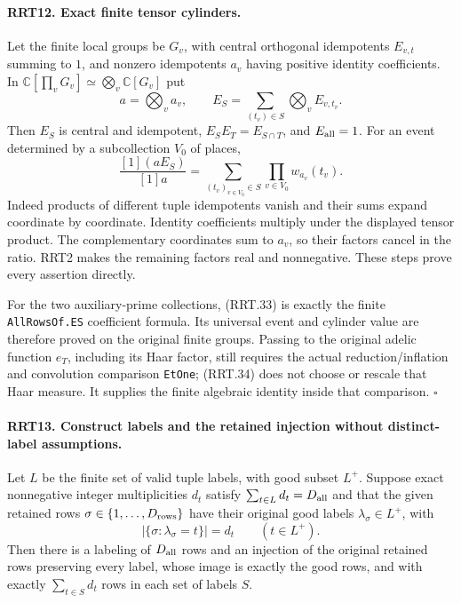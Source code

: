\documentclass[11pt,a4paper]{article}
\numberwithin{equation}{section}
\theoremstyle{remark}\newtheorem{remark}[theorem]{Remark}
\begin{document}
\paragraph{RRT12. Exact finite tensor cylinders.}
\label{claim:RRT12}
Let the finite local groups be $G_v$, with central orthogonal
idempotents $E_{v,\allowbreak{} t}$ summing to $1$, and nonzero idempotents
$a_v$ having positive identity coefficients.  In
$\mathbb C[\prod_vG_v]\simeq\bigotimes_v\mathbb C[G_v]$ put
\[
 a=\bigotimes_va_v,\qquad
 E_S=\sum_{(t_v)\in S}\bigotimes_vE_{v,\allowbreak{} t_v}.
 \tag{RRT.33}
\]
Then $E_S$ is central and idempotent,
$E_SE_T=E_{S\cap T}$, and $E_{\rm all}=1$.
For an event determined by a subcollection $V_0$ of places,
\[
 \frac{[1](aE_S)}{[1]a}
          =\sum_{(t_v)_{v\in V_0}\in S}
                   \prod_{v\in V_0}w_{a_v}(t_v).
 \tag{RRT.34}
\]
Indeed products of different tuple idempotents vanish and
their sums expand coordinate by coordinate.  Identity
coefficients multiply under the displayed tensor product.
The complementary coordinates sum to $a_v$, so their factors
cancel in the ratio.  RRT2 makes the remaining factors real
and nonnegative.  These steps prove every assertion directly.

For the two auxiliary-prime collections, (RRT.33) is exactly
the finite \texttt{All\allowbreak Rows\allowbreak Of.\allowbreak ES} coefficient formula.  Its
universal event and cylinder value are therefore proved on
the original finite groups.  Passing to the original adelic
function $e_T$, including its Haar factor, still requires the
actual reduction/inflation and convolution comparison
\texttt{Et\allowbreak One}; (RRT.34) does not choose or rescale that Haar
measure.  It supplies the finite algebraic identity inside
that comparison.
\hfill$\square$

\paragraph{RRT13. Construct labels and the retained injection without distinct-label assumptions.}
\label{claim:RRT13}
Let $L$ be the finite set of valid tuple labels, with good
subset $L^+$.  Suppose exact nonnegative integer multiplicities
$d_t$ satisfy $\sum_{t\in L}d_t=D_{\rm all}$ and that the
given retained rows $\sigma\in\{1,\ldots,\allowbreak{} D_{\rm rows}\}$ have
their original good labels $\lambda_\sigma\in L^+$, with
\[
       |\{\sigma:\lambda_\sigma=t\}|=d_t\qquad(t\in L^+).
 \tag{RRT.35}
\]
Then there is a labeling of $D_{\rm all}$ rows and an
injection of the original retained rows preserving every
label, whose image is exactly the good rows, and with exactly
$\sum_{t\in S}d_t$ rows in each set of labels $S$.
\end{document}
